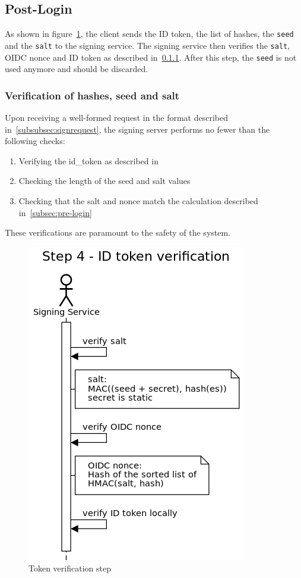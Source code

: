 \subsection{Post-Login}\label{subsec:post-login}
As shown in figure~\ref{fig:tokenverificationstep},
the client sends the ID token, the list of hashes, the \texttt{seed} and the \texttt{salt} to the signing service.
The signing service then verifies the \texttt{salt}, OIDC nonce and ID token as described in~\ref{subsubsec:verificationhashesseedsalt}.
After this step, the \texttt{seed} is not used anymore and should be discarded.


\subsubsection{Verification of hashes, seed and salt}\label{subsubsec:verificationhashesseedsalt}
Upon receiving a well-formed request in the format described in~\ref{subsubsec:signrequest},
the signing server performs no fewer than the following checks:
\begin{enumerate}
    \item Verifying the id\_token as described in~\cite[Section~7.2]{rfc7519}
    \item Checking the length of the seed and salt values
    \item Checking that the salt and nonce match the calculation described in~\ref{subsec:pre-login}
\end{enumerate}
These verifications are paramount to the safety of the system.

\begin{figure}
    \begin{center}
        \includegraphics[scale=0.5]{images/protocol_step4_id_token_verification.png}
        \caption{Token verification step}
        \label{fig:tokenverificationstep}
    \end{center}
\end{figure}

